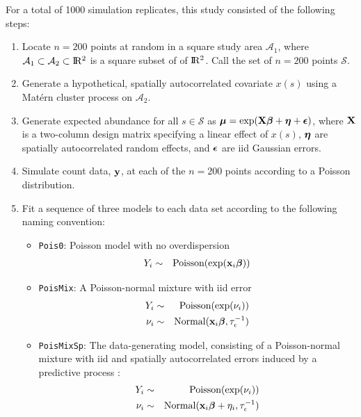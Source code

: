 \documentclass[12pt,english]{article}
\begin{document}
\begin{spacing}{1.9}
For a total of 1000 simulation replicates, this study consisted of the following steps:
\begin{enumerate}
  \item Locate $n=200$ points at random in a square study area $\mathcal{A}_1$, where $\mathcal{A}_1 \subset \mathcal{A}_2 \subset \R2$ is a square subset of of $\R2$.  Call the set of $n=200$ points $\mathcal{S}$.
  \item Generate a hypothetical, spatially autocorrelated covariate $x(s)$ using a Mat\'{e}rn cluster process on $\mathcal{A}_2$.
  \item  Generate expected abundance for all $s \in \mathcal{S}$ as $\boldsymbol{\mu} = \exp( {\bf X}\boldsymbol{\beta} + \boldsymbol{\eta} +\boldsymbol{\epsilon} )$, where ${\bf X}$ is a two-column design matrix specifying a linear effect of $x(s)$, $\boldsymbol{\eta}$ are spatially autocorrelated random effects, and $\boldsymbol{\epsilon}$ are iid Gaussian errors.
  \item Simulate count data, ${\bf y}$, at each of the $n=200$ points according to a Poisson distribution.
  \item Fit a sequence of three models to each data set according to the following naming convention:
      \begin{itemize}
        \item \texttt{Pois0}: Poisson model with no overdispersion
         \begin{eqnarray*}
           Y_i & \sim & \textrm{Poisson}(\exp({\bf x}_i \boldsymbol{\beta})) \\
         \end{eqnarray*}
        \item \texttt{PoisMix}: A Poisson-normal mixture with iid error
         \begin{eqnarray*}
           Y_i & \sim & \textrm{Poisson}(\exp(\nu_i)) \\
           \nu_i & \sim & \textrm{Normal}({\bf x}_i \boldsymbol{\beta}, \tau_\epsilon^{-1})\\
          \end{eqnarray*}
        \item \texttt{PoisMixSp}: The data-generating model, consisting of a Poisson-normal mixture with iid and spatially autocorrelated errors induced by a predictive process \citep[cf.][]{BanerjeeEtAl2008}:
          \begin{eqnarray*}
           Y_i & \sim & \textrm{Poisson}(\exp(\nu_i)) \\
           \nu_i & \sim & \textrm{Normal}(\bfx_i \bfbeta + \eta_i, \tau_\epsilon^{-1}) \\

\end{eqnarray*}
\end{itemize}
\end{enumerate}
\end{spacing}
\end{document}
